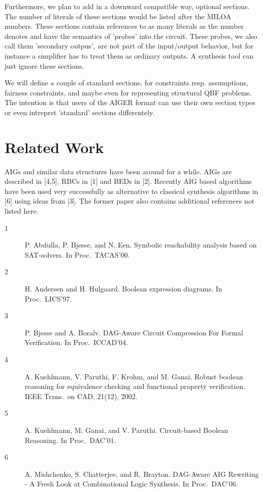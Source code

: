 \documentclass[10pt]{llncs}
\begin{document}
  Furthermore, we plan to add in a downward compatible way, optional
  sections.  The number of literals of these sections would be listed after
  the MILOA numbers.  These sections contain references to as many literals
  as the number denotes and have the semantics of 'probes' into the circuit.
  These probes, we also call them 'secondary outpus', are not part of the
  input/output behavior, but for instance a simplifier has to treat them as
  ordinary outputs.  A synthesis tool can just ignore these sections.
  
  We will define a couple of standard sections, for constraints resp.
  assumptions, fairness constraints, and maybe even for representing
  structural QBF problems.  The intention is that users of the AIGER format
  can use their own section types or even intrepret 'standard' sections
  differentely.
  
\newpage
\section{Related Work}

  AIGs and similar data structures have been around for a while.  AIGs are
  described in [4,5], RBCs in [1] and BEDs in [2].  Recently AIG based
  algorithms have been used very successfully as alternative to classical
  synthesis algorithms in [6] using ideas from [3].  The former paper
  also contains additional references not listed here.

\begin{description}

\item[1] P. Abdulla, P. Bjesse, and N. Een.
  Symbolic reachability analysis based on SAT-solvers.
  In Proc.~TACAS'00.

\item[2] H. Andersen and H. Hulgaard. 
  Boolean expression diagrams.
  In Proc.~LICS'97.

\item[3] P. Bjesse and A. Boralv.
  DAG-Aware Circuit Compression For Formal Verification.
  In Proc.~ICCAD'04.

\item[4] A. Kuehlmann, V. Paruthi, F. Krohm, and M. Ganai.
  Robust boolean reasoning for equivalence checking and functional 
  property verification.
  IEEE Trans.~on CAD, 21(12), 2002. 

\item[5] A. Kuehlmann, M. Ganai, and V. Paruthi. 
  Circuit-based Boolean Reasoning. 
  In Proc.~DAC'01.

\item[6] A. Mishchenko, S. Chatterjee, and R. Brayton. 
  DAG-Aware AIG Rewriting - A Fresh Look at Combinational Logic Synthesis. 
  In Proc.~DAC'06. 

\end{description}
\end{document}
